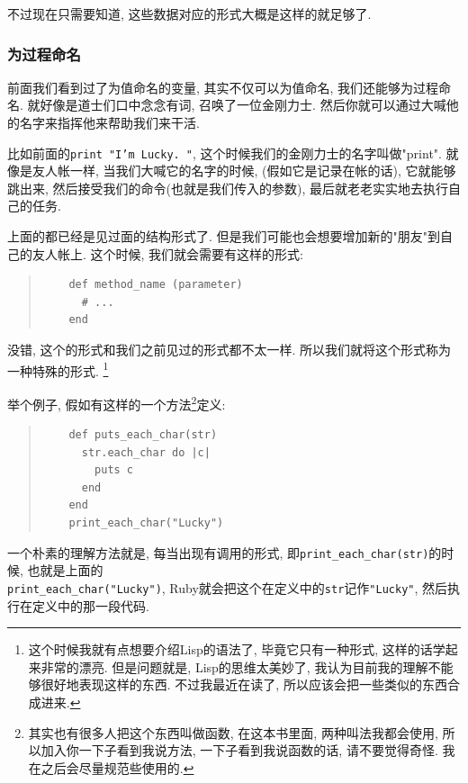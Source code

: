 不过现在只需要知道, 这些数据对应的形式大概是这样的就足够了. 

\subsubsection*{为过程命名}
前面我们看到过了为值命名的变量, 其实不仅可以为值命名, 我们还能够为过程命名. 就好像是道士们口中念念有词, 召唤了一位金刚力士. 然后你就可以通过大喊他的名字来指挥他来帮助我们来干活. 

比如前面的\texttt{print "I'm Lucky. "}, 这个时候我们的金刚力士的名字叫做"print". 就像是友人帐一样, 当我们大喊它的名字的时候, (假如它是记录在帐的话), 它就能够跳出来, 然后接受我们的命令(也就是我们传入的参数), 最后就老老实实地去执行自己的任务. 

上面的都已经是见过面的结构形式了. 但是我们可能也会想要增加新的"朋友"到自己的友人帐上. 这个时候, 我们就会需要有这样的形式: 

\begin{quotation}
  \begin{verbatim}
    def method_name (parameter)
      # ...
    end
  \end{verbatim}
\end{quotation}

没错, 这个的形式和我们之前见过的形式都不太一样. 所以我们就将这个形式称为一种特殊的形式. \footnote{这个时候我就有点想要介绍Lisp的语法了, 毕竟它只有一种形式, 这样的话学起来非常的漂亮. 但是问题就是, Lisp的思维太美妙了, 我认为目前我的理解不能够很好地表现这样的东西. 不过我最近在读了, 所以应该会把一些类似的东西合成进来. }

举个例子, 假如有这样的一个方法\footnote{其实也有很多人把这个东西叫做函数, 在这本书里面, 两种叫法我都会使用, 所以加入你一下子看到我说方法, 一下子看到我说函数的话, 请不要觉得奇怪. 我在之后会尽量规范些使用的. }定义: 

\begin{quotation}
  \begin{verbatim}
    def puts_each_char(str)
      str.each_char do |c|
        puts c
      end
    end
    print_each_char("Lucky")
  \end{verbatim}
\end{quotation}

一个朴素的理解方法就是, 每当出现有调用的形式, 即\texttt{print_each_char(str)}的时候, 也就是上面的\\\texttt{print_each_char("Lucky")}, Ruby就会把这个在定义中的\texttt{str}记作\texttt{"Lucky"}, 然后执行在定义中的那一段代码. 

